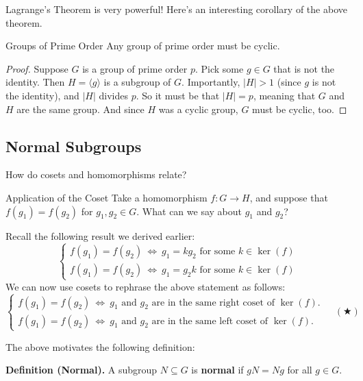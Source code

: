 Lagrange's Theorem is very powerful!  Here's an interesting corollary of the above theorem.

\begin{theorem}{Groups of Prime Order}
    Any group of prime order must be cyclic.
\end{theorem}

\begin{proof}
    Suppose $G$ is a group of prime order $p$.  Pick some $g \in G$ that is not the identity.  Then $H = \langle g \rangle$ is a subgroup of $G$.  Importantly, $|H| > 1$ (since $g$ is not the identity), and $|H|$ divides $p$.  So it must be that $|H| = p$, meaning that $G$ and $H$ are the same group.  And since $H$ was a cyclic group, $G$ must be cyclic, too.
\end{proof}

\subsection{Normal Subgroups}

How do cosets and homomorphisms relate?

\begin{problem}{Application of the Coset}
    Take a homomorphism $f: G \to H$, and suppose that $f(g_1) = f(g_2)$ for $g_1, g_2 \in G$.  What can we say about $g_1$ and $g_2$?
\end{problem}

\begin{solution*}
    Recall the following result we derived earlier:
    \[ \boxed{\begin{cases}f(g_1) = f(g_2) ~ \iff ~ g_1 = kg_2 \text{ for some } k \in \ker(f) \\
    f(g_1) = f(g_2) ~ \iff ~ g_1 = g_2k \text{ for some } k \in \ker(f)\end{cases}} \]
    We can now use cosets to rephrase the above statement as follows:
    \[ \boxed{\begin{cases}f(g_1) = f(g_2) ~ \iff ~ g_1 \text{ and } g_2 \text{ are in the same right coset of } \ker(f). \\
    f(g_1) = f(g_2) ~ \iff ~ g_1 \text{ and } g_2 \text{ are in the same left coset of } \ker(f). \end{cases}} ~~~~~ (\bigstar) \]
\end{solution*}

The above motivates the following definition:

\textbf{Definition (Normal).} A subgroup $N \subseteq G$ is \textbf{normal} if $gN = Ng$ for all $g \in G$.

